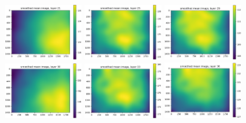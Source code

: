 \documentclass[letterpaper,11pt]{article}
\begin{document}
\begin{figure}[!hb]
\centering
\includegraphics[width=0.3\textwidth]{images/results/smoothed_mean_image_layers_polaris/smoothed_mean_image_layer_21}
\includegraphics[width=0.3\textwidth]{images/results/smoothed_mean_image_layers_polaris/smoothed_mean_image_layer_25}
\includegraphics[width=0.3\textwidth]{images/results/smoothed_mean_image_layers_polaris/smoothed_mean_image_layer_29}
\includegraphics[width=0.3\textwidth]{images/results/smoothed_mean_image_layers_polaris/smoothed_mean_image_layer_30}
\includegraphics[width=0.3\textwidth]{images/results/smoothed_mean_image_layers_polaris/smoothed_mean_image_layer_33}
\includegraphics[width=0.3\textwidth]{images/results/smoothed_mean_image_layers_polaris/smoothed_mean_image_layer_36}

\end{figure}
\end{document}
